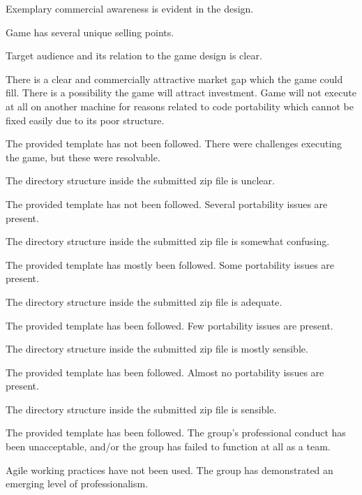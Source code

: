 \documentclass{../fal_assignment}
\begin{document}
\begin{markingrubric}
        \grade Exemplary commercial awareness is evident in the design.
            \par Game has several unique selling points.
            \par Target audience and its relation to the game design is clear.
            \par There is a clear and commercially attractive market gap which the game could fill. There is a possibility the game will attract investment.
%
        \grade\fail Game will not execute at all on another machine for reasons related to code portability which cannot be fixed easily due to its poor structure.
            \par The provided template has not been followed.
        \grade There were challenges executing the game, but these were resolvable.
            \par The directory structure inside the submitted zip file is unclear.
            \par The provided template has not been followed.
        \grade Several portability issues are present.
            \par The directory structure inside the submitted zip file is somewhat confusing.
            \par The provided template has mostly been followed.
        \grade Some portability issues are present.
            \par The directory structure inside the submitted zip file is adequate.
            \par The provided template has been followed.
        \grade Few portability issues are present.
            \par The directory structure inside the submitted zip file is mostly sensible.
            \par The provided template has been followed.
        \grade Almost no portability issues are present.
            \par The directory structure inside the submitted zip file is sensible.
            \par The provided template has been followed.
%
        \grade\fail The group's professional conduct has been unacceptable,
            and/or the group has failed to function at all as a team.
            \par Agile working practices have not been used.
        \grade The group has demonstrated an emerging level of professionalism.

\end{markingrubric}
\end{document}
